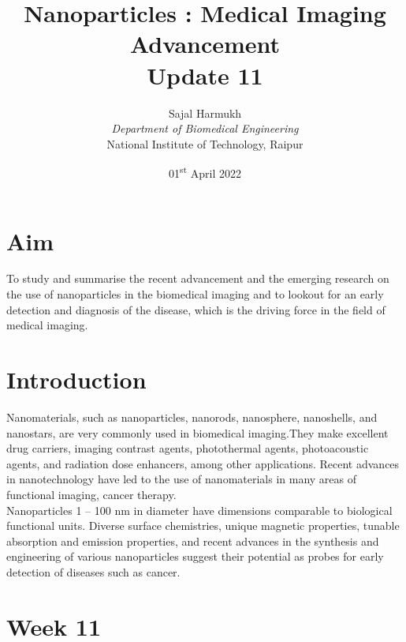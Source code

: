 \documentclass{article}
\title{\textbf{Nanoparticles : Medical Imaging Advancement\\Update 11}}
\author{Sajal Harmukh \\ \textit{Department of Biomedical Engineering} \\ National Institute of Technology, Raipur }
\date{01\textsuperscript{st} April 2022}
\begin{document}
\maketitle

\section*{Aim}
\large
To study and summarise the recent advancement and the emerging research on the use of nanoparticles in the biomedical imaging and to lookout for an early detection and diagnosis of the disease, which is the driving force in the field of medical imaging.

\section*{Introduction}
Nanomaterials, such as nanoparticles, nanorods, nanosphere, nanoshells, and nanostars, are
very commonly used in biomedical imaging.They make excellent drug carriers, imaging contrast agents, photothermal agents, photoacoustic agents, and radiation dose enhancers, among other applications. Recent advances in nanotechnology have led to the use of nanomaterials
in many areas of functional imaging, cancer therapy.\\ Nanoparticles 1 – 100 nm in diameter have dimensions comparable to biological functional units. Diverse surface chemistries, unique magnetic properties, tunable absorption and emission properties, and recent advances in the synthesis and engineering of various nanoparticles suggest their potential as probes for early detection of diseases such as cancer.
 


\section*{Week 11 }
\end{document}
